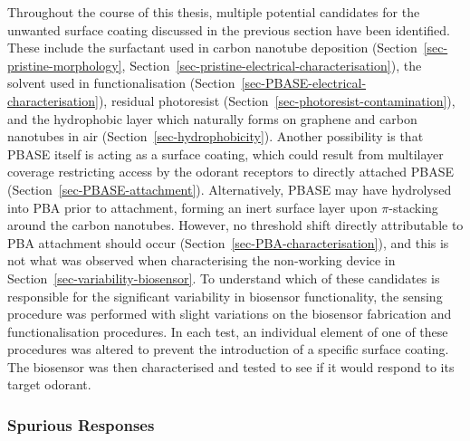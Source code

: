 \documentclass[
  a4paper,
]{scrbook}
\begin{document}
Throughout the course of this thesis, multiple potential candidates for
the unwanted surface coating discussed in the previous section have been
identified. These include the surfactant used in carbon nanotube
deposition (Section~\ref{sec-pristine-morphology},
Section~\ref{sec-pristine-electrical-characterisation}), the solvent
used in functionalisation
(Section~\ref{sec-PBASE-electrical-characterisation}), residual
photoresist (Section~\ref{sec-photoresist-contamination}), and the
hydrophobic layer which naturally forms on graphene and carbon nanotubes
in air (Section~\ref{sec-hydrophobicity}). Another possibility is that
PBASE itself is acting as a surface coating, which could result from
multilayer coverage restricting access by the odorant receptors to
directly attached PBASE (Section~\ref{sec-PBASE-attachment}).
Alternatively, PBASE may have hydrolysed into PBA prior to attachment,
forming an inert surface layer upon \(\pi\)-stacking around the carbon
nanotubes. However, no threshold shift directly attributable to PBA
attachment should occur (Section~\ref{sec-PBA-characterisation}), and
this is not what was observed when characterising the non-working device
in Section~\ref{sec-variability-biosensor}. To understand which of these
candidates is responsible for the significant variability in biosensor
functionality, the sensing procedure was performed with slight
variations on the biosensor fabrication and functionalisation
procedures. In each test, an individual element of one of these
procedures was altered to prevent the introduction of a specific surface
coating. The biosensor was then characterised and tested to see if it
would respond to its target odorant.

\hypertarget{spurious-responses}{%
\subsubsection*{Spurious Responses}\label{spurious-responses}}
\end{document}
